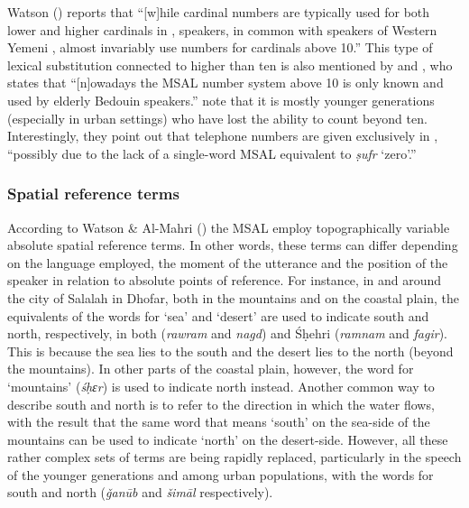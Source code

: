 \documentclass[output=paper]{langsci/langscibook}
\begin{document}
Watson (\citeyear[3]{Watson2012}) reports that ``[w]hile   cardinal numbers  are  typically  used  for  both  lower  and  higher  cardinals  in  ,   speakers,  in  common  with  speakers  of  Western  {Yemeni}  , almost invariably use  numbers for cardinals above 10.'' This type of lexical substitution connected to  higher than ten is also mentioned by \citet{Lonnet2011} and \citet[1088]{Simeone-Senelle2011}, who states that ``[n]owadays the MSAL number system above 10 is only known and used by elderly Bedouin speakers.'' \citet[90]{WatsonAl-Mahri2017} note that it is mostly younger generations (especially in urban settings) who have lost the ability to count beyond ten. Interestingly, they point out that telephone numbers are given exclusively in , “possibly due to the lack of a single-word MSAL equivalent to  \textit{ṣufr} ‘zero’.”


 \subsubsection{Spatial reference terms}

According to Watson \& Al-Mahri (\citeyear[91]{WatsonAl-Mahri2017}) the MSAL employ topographically variable absolute spatial reference terms. In other words, these terms can differ depending on the language employed, the moment of the utterance and the position of the speaker in relation to absolute points of reference. For instance, in and around the city of Salalah in Dhofar, both in the mountains and on the coastal plain, the equivalents of the words for ‘sea’ and ‘desert’ are used to indicate south and north, respectively, in both  (\textit{rawram} and \textit{nagd}) and Śḥehri (\textit{ramnam} and \textit{fagir}). This is because the sea lies to the south and the desert lies to the north (beyond the mountains). In other parts of the coastal plain, however, the word for ‘mountains’ (\textit{śḥɛr}) is used to indicate north instead. Another common way to describe south and north is to refer to the direction in which the water flows, with the result that the same word that means ‘south’ on the sea-side of the mountains can be used to indicate ‘north’ on the desert-side. However, all these rather complex sets of terms are being rapidly replaced, particularly in the speech of the younger generations and among urban populations, with the  words for south and north (\textit{ǧanūb} and \textit{šimāl} respectively).
\end{document}
